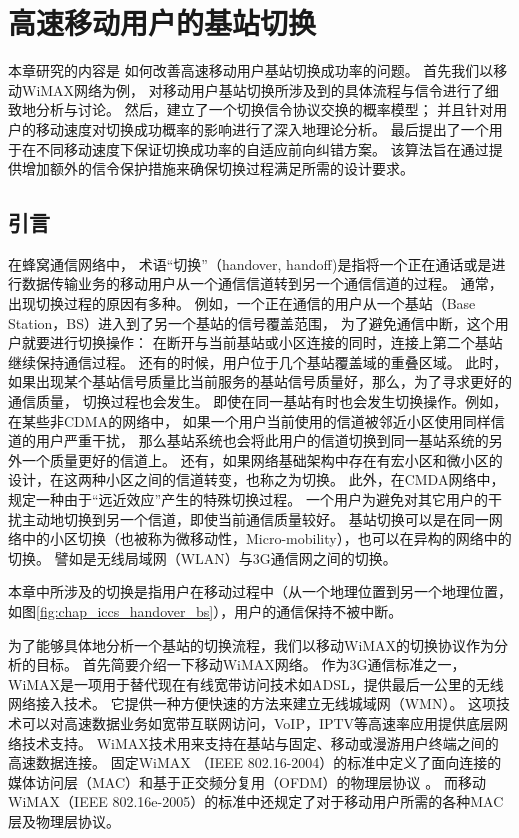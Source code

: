 \graphicspath{ {../body/handover_figures/}}
\chapter{高速移动用户的基站切换}
\label{chap_iccs_handover_alogrithm}
本章研究的内容是
如何改善高速移动用户基站切换成功率的问题。
首先我们以移动WiMAX网络为例，
对移动用户基站切换所涉及到的具体流程与信令进行了细致地分析与讨论。
然后，建立了一个切换信令协议交换的概率模型；
并且针对用户的移动速度对切换成功概率的影响进行了深入地理论分析。
最后提出了一个用于在不同移动速度下保证切换成功率的自适应前向纠错方案。
该算法旨在通过提供增加额外的信令保护措施来确保切换过程满足所需的设计要求。


\section{引言}
\label{section_iccs_handover_algorithm_introduction}
在蜂窝通信网络中，
术语“切换”（handover, handoff)是指将一个正在通话或是进行数据传输业务的移动用户从一个通信信道转到另一个通信信道的过程。
通常，出现切换过程的原因有多种。
例如，一个正在通信的用户从一个基站（Base Station，BS）进入到了另一个基站的信号覆盖范围，
为了避免通信中断，这个用户就要进行切换操作：
在断开与当前基站或小区连接的同时，连接上第二个基站继续保持通信过程。
还有的时候，用户位于几个基站覆盖域的重叠区域。
此时，如果出现某个基站信号质量比当前服务的基站信号质量好，那么，为了寻求更好的通信质量，
切换过程也会发生。
即使在同一基站有时也会发生切换操作。例如，在某些非CDMA的网络中，
如果一个用户当前使用的信道被邻近小区使用同样信道的用户严重干扰，
那么基站系统也会将此用户的信道切换到同一基站系统的另外一个质量更好的信道上。
还有，如果网络基础架构中存在有宏小区和微小区的设计，在这两种小区之间的信道转变，也称之为切换。
此外，在CMDA网络中，规定一种由于“远近效应”产生的特殊切换过程。
一个用户为避免对其它用户的干扰主动地切换到另一个信道，即使当前通信质量较好。
基站切换可以是在同一网络中的小区切换（也被称为微移动性，Micro-mobility），也可以在异构的网络中的切换。
譬如是无线局域网（WLAN）与3G通信网之间的切换。

本章中所涉及的切换是指用户在移动过程中（从一个地理位置到另一个地理位置，如图\ref{fig:chap_iccs_handover_bs}），用户的通信保持不被中断\cite{Pollini:1996:THD}\cite{Wright:ICMB2007}。

为了能够具体地分析一个基站的切换流程，我们以移动WiMAX的切换协议作为分析的目标。
首先简要介绍一下移动WiMAX网络。
作为3G通信标准之一，WiMAX是一项用于替代现在有线宽带访问技术如ADSL，提供最后一公里的无线网络接入技术。
它提供一种方便快速的方法来建立无线城域网（WMN）。
这项技术可以对高速数据业务如宽带互联网访问，VoIP，IPTV等高速率应用提供底层网络技术支持。
WiMAX技术用来支持在基站与固定、移动或漫游用户终端之间的高速数据连接。
固定WiMAX （IEEE 802.16-2004）的标准中定义了面向连接的媒体访问层（MAC）和基于正交频分复用（OFDM）的物理层协议 \cite{IEEE:802_16D:2005}。
而移动WiMAX（IEEE 802.16e-2005）的标准中还规定了对于移动用户所需的各种MAC层及物理层协议\cite{IEEE:802_16E:2006}。


